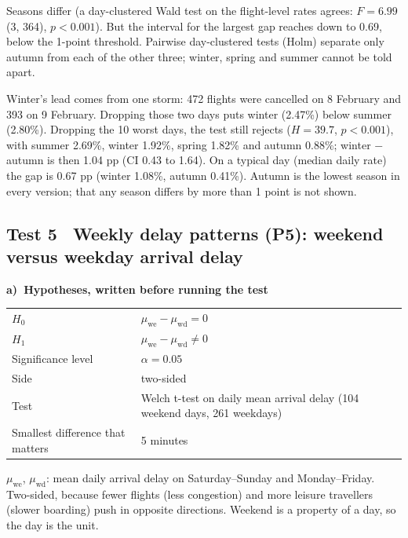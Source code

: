 \documentclass[10pt,a4paper,twocolumn]{article}
\newcommand{\egblock}[1]{{\color{eg}#1\par}}
\newcommand{\tpart}[2]{\par\needspace{12\baselineskip}\smallskip\textbf{#1)~#2}\par}
\begin{document}
\egblock{Seasons differ (a day-clustered Wald test on the flight-level rates agrees: $F=6.99$ (3,
364), $p<0.001$). But the interval for the largest gap reaches down to 0.69, below the 1-point
threshold. Pairwise day-clustered tests (Holm) separate only autumn from each of the other three;
winter, spring and summer cannot be told apart.}

\egblock{Winter's lead comes from one storm: 472 flights were cancelled on 8 February and 393 on 9
February. Dropping those two days puts winter (2.47\%) below summer (2.80\%). Dropping the 10
worst days, the test still rejects ($H=39.7$, $p<0.001$), with summer 2.69\%, winter 1.92\%,
spring 1.82\% and autumn 0.88\%; winter $-$ autumn is then 1.04 pp (CI 0.43 to 1.64). On a typical
day (median daily rate) the gap is 0.67 pp (winter 1.08\%, autumn 0.41\%). Autumn is the lowest
season in every version; that any season differs by more than 1 point is not shown.}

\subsection*{Test 5 \textbullet\ Weekly delay patterns (P5): weekend versus weekday arrival
delay}

\tpart{a}{Hypotheses, written before running the test}
{\small
\begin{tabularx}{\linewidth}{@{}K{3.4cm} Y@{}}
\toprule
$H_0$ & $\mu_{\text{we}}-\mu_{\text{wd}}=0$ \\
$H_1$ & $\mu_{\text{we}}-\mu_{\text{wd}}\ne0$ \\
Significance level & $\alpha=0.05$ \\
Side & two-sided \\
Test & Welch t-test on daily mean arrival delay (104 weekend days, 261 weekdays) \\
Smallest difference that matters & 5 minutes \\
\bottomrule
\end{tabularx}}

\egblock{$\mu_{\text{we}}$, $\mu_{\text{wd}}$: mean daily arrival delay on Saturday--Sunday and
Monday--Friday. Two-sided, because fewer flights (less congestion) and more leisure travellers
(slower boarding) push in opposite directions. Weekend is a property of a day, so the day is the
unit.}
\end{document}
